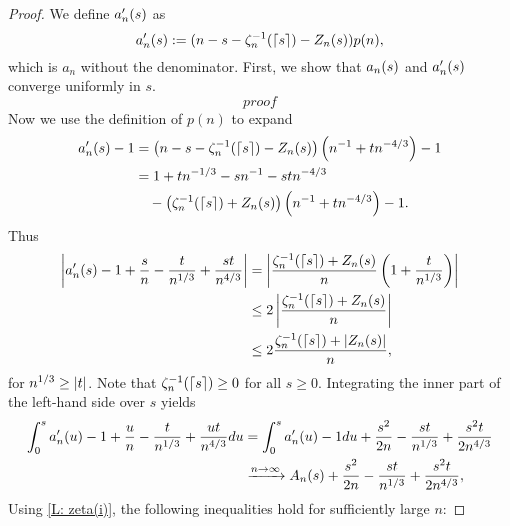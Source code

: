 \begin{proof} \label{P: limit An}
	We define $a'_n(s)$ as
	\begin{equation}
		a'_n(s) := (n - s - \zeta^{-1}_n(\lceil s\rceil) - Z_n(s)) p(n),
	\end{equation}
	which is $a_n$ without the denominator.
	First, we show that $a_n(s)$ and $a'_n(s)$ converge uniformly in $s$.
	\begin{equation}
	proof
	\end{equation}
	Now we use the definition of $p(n)$ to expand
	\begin{align*}
	a'_n(s) - 1 
	&= \left( n - s - \zeta^{-1}_n(\lceil s\rceil) - Z_n(s) \right) \left( n^{-1} + tn^{-4 / 3} \right) - 1 \\
	&= 1 + tn^{-1 / 3} - sn^{-1} - stn^{-4 / 3} \\
	&\quad - \left( \zeta^{-1}_n(\lceil s\rceil) + Z_n(s) \right) \left( n^{-1} + tn^{-4 / 3} \right) -1 .
	\end{align*}
	Thus
	\begin{equation} \label{E: (27)} 
	\begin{aligned}
	\left| a'_n(s) - 1 + \frac{s}{n} - \frac{t}{n^{1 / 3}} + \frac{st}{n^{4 / 3}} \right|
	&= \left| \frac{\zeta^{-1}_n(\lceil s\rceil) + Z_n(s)}{n} \left( 1 + \frac{t}{n^{1 / 3}} \right) \right| \\
	&\leq 2 \left| \frac{\zeta^{-1}_n(\lceil s\rceil) + Z_n(s)}{n} \right| \\
	&\leq 2 \frac{\zeta^{-1}_n(\lceil s\rceil) + |Z_n(s)|}{n} ,  
	\end{aligned}
	\end{equation}
	for $n^{1 / 3} \geq |t|$. Note that $\zeta^{-1}_n(\lceil s\rceil) \geq 0$ for all $s \geq 0$.
	Integrating the inner part of the left-hand side over $s$ yields
	\begin{align*}
	\int_{0}^{s} a'_n(u) - 1 + \frac{u}{n} - \frac{t}{n^{1 / 3}} + \frac{ut}{n^{4 / 3}} du
	&= \int_{0}^{s} a'_n(u) - 1 du + \frac{s^2}{2n} - \frac{st}{n^{1 / 3}} + \frac{s^2t}{2n^{4 / 3}} \\
	&\xrightarrow{n \rightarrow \infty} A_n(s) + \frac{s^2}{2n} - \frac{st}{n^{1 / 3}} + \frac{s^2t}{2n^{4 / 3}},
	\end{align*}
	Using \ref{L: zeta(i)}, the following inequalities hold for sufficiently large $n$:

\end{proof}
